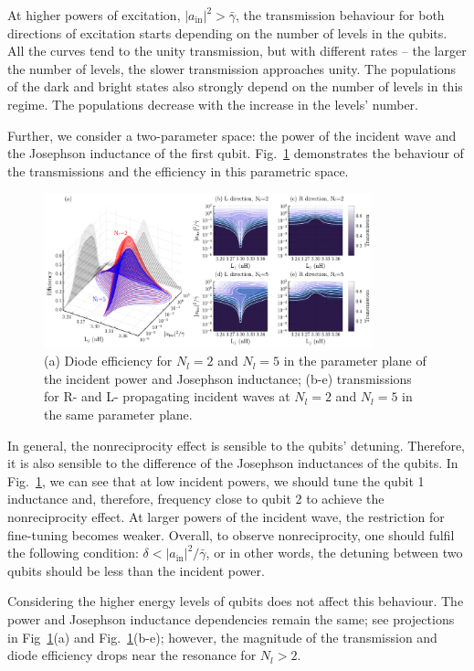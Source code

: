 \documentclass[lettersize,journal]{IEEEtran}
\begin{document}
At higher powers of excitation, $|a_\mathrm{in}|^2 > \bar{\gamma}$, the transmission behaviour for both directions of excitation starts depending on the number of levels in the qubits.
All the curves tend to the unity transmission, but with different rates -- the larger the number of levels, the slower transmission approaches unity.
The populations of the dark and bright states also strongly depend on the number of levels in this regime.
The populations decrease with the increase in the levels' number.

Further, we consider a two-parameter space: the power of the incident wave and the Josephson inductance of the first qubit.
Fig.~\ref{fig:05} demonstrates the behaviour of the transmissions and the efficiency in this parametric space.
\begin{figure}[h]
    \centering
    \includegraphics[width=0.85\textwidth]{fig_5}
    \caption{(a) Diode efficiency for $N_l = 2$ and $N_l = 5$ in the parameter plane of the incident power and Josephson inductance; (b-e) transmissions for R- and L- propagating incident waves at $N_l = 2$ and $N_l = 5$ in the same parameter plane.}
    \label{fig:05}
\end{figure}
In general, the nonreciprocity effect is sensible to the qubits' detuning.
Therefore, it is also sensible to the difference of the Josephson inductances of the qubits.
In Fig.~\ref{fig:05}, we can see that at low incident powers, we should tune the qubit 1 inductance and, therefore, frequency close to qubit 2 to achieve the nonreciprocity effect.
At larger powers of the incident wave, the restriction for fine-tuning becomes weaker.
Overall, to observe nonreciprocity, one should fulfil the following condition: $\delta < |a_\mathrm{in}|^2 / \bar{\gamma}$, or in other words, the detuning between two qubits should be less than the incident power.

Considering the higher energy levels of qubits does not affect this behaviour.
The power and Josephson inductance dependencies remain the same; see projections in Fig~\ref{fig:05}(a) and Fig.~\ref{fig:05}(b-e); however, the magnitude of the transmission and diode efficiency drops near the resonance for $N_l > 2$.
\end{document}
